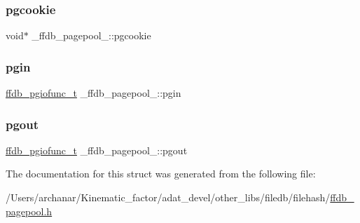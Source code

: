 \mbox{\label{struct__ffdb__pagepool___a195cda3aa567698eabdd06798e92a040}} 
\subsubsection{\texorpdfstring{pgcookie}{pgcookie}}
{\footnotesize\ttfamily void$\ast$ \+\_\+ffdb\+\_\+pagepool\+\_\+\+::pgcookie}

\mbox{\label{struct__ffdb__pagepool___a924150097b3bab2a4cc04415b9cf5ed4}} 
\subsubsection{\texorpdfstring{pgin}{pgin}}
{\footnotesize\ttfamily \mbox{\hyperlink{ffdb__pagepool_8h_abe9c83a47a1f5babe21df1582aeb8022}{ffdb\+\_\+pgiofunc\+\_\+t}} \+\_\+ffdb\+\_\+pagepool\+\_\+\+::pgin}

\mbox{\label{struct__ffdb__pagepool___aea51254f721e3ef10da84d3afade7f4c}} 
\subsubsection{\texorpdfstring{pgout}{pgout}}
{\footnotesize\ttfamily \mbox{\hyperlink{ffdb__pagepool_8h_abe9c83a47a1f5babe21df1582aeb8022}{ffdb\+\_\+pgiofunc\+\_\+t}} \+\_\+ffdb\+\_\+pagepool\+\_\+\+::pgout}



The documentation for this struct was generated from the following file\+:\begin{DoxyCompactItemize}
\item 
/\+Users/archanar/\+Kinematic\+\_\+factor/adat\+\_\+devel/other\+\_\+libs/filedb/filehash/\mbox{\hyperlink{ffdb__pagepool_8h}{ffdb\+\_\+pagepool.\+h}}\end{DoxyCompactItemize}
